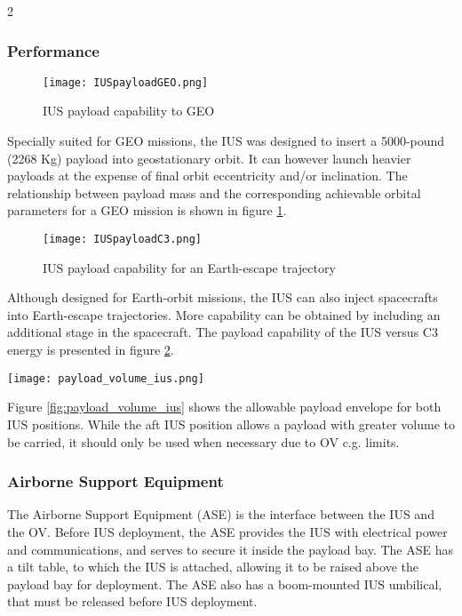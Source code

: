 \documentclass[Space_Shuttle_Vessel_Manual.tex]{subfiles}
\begin{document}
\begin{multicols*}{2}
\subsubsection{Performance}
\begin{figure}[H]
	\centering
	\captionsetup{justification=centering}
  \texttt{[image: IUSpayloadGEO.png]}
  \caption{IUS payload capability to GEO}
  \label{fig:IUSpayloadGEO}
\end{figure}
\noindent
Specially suited for GEO missions, the IUS was designed to insert a 5000-pound (2268 Kg) payload into geostationary orbit. It can however launch heavier payloads at the expense of final orbit eccentricity and/or inclination. The relationship between payload mass and the corresponding achievable orbital parameters for a GEO mission is shown in figure \ref{fig:IUSpayloadGEO}.\\

\begin{figure}[H]
	\centering
	\captionsetup{justification=centering}
  \texttt{[image: IUSpayloadC3.png]}
  \caption{IUS payload capability for an Earth-escape trajectory}
  \label{fig:IUSpayloadC3}
\end{figure}
\noindent
Although designed for Earth-orbit missions, the IUS can also inject spacecrafts into Earth-escape trajectories. More capability can be obtained by including an additional stage in the spacecraft. The payload capability of the IUS versus C3 energy is presented in figure \ref{fig:IUSpayloadC3}.

\begin{figure*}[t!]
  \centering
  \texttt{[image: payload\_volume\_ius.png]}
  \caption{IUS payload envelope (dimensions in meters)}
  \label{fig:payload_volume_ius}
\end{figure*}
\noindent
Figure \ref{fig:payload_volume_ius} shows the allowable payload envelope for both IUS positions. While the aft IUS position allows a payload with greater volume to be carried, it should only be used when necessary due to OV c.g. limits.

\subsubsection{Airborne Support Equipment}
The Airborne Support Equipment (ASE) is the interface between the IUS and the OV. Before IUS deployment, the ASE provides the IUS with electrical power and communications, and serves to secure it inside the payload bay. The ASE has a tilt table, to which the IUS is attached, allowing it to be raised above the payload bay for deployment. The ASE also has a boom-mounted IUS umbilical, that must be released before IUS deployment.


\end{multicols*}
\end{document}
